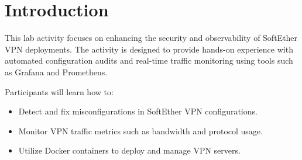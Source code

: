 \section{Introduction}

This lab activity focuses on enhancing the security and observability of SoftEther VPN deployments. The activity is designed to provide hands-on experience with automated configuration audits and real-time traffic monitoring using tools such as Grafana and Prometheus.

Participants will learn how to:
\begin{itemize}
    \item Detect and fix misconfigurations in SoftEther VPN configurations.
    \item Monitor VPN traffic metrics such as bandwidth and protocol usage.
    \item Utilize Docker containers to deploy and manage VPN servers.
\end{itemize}
